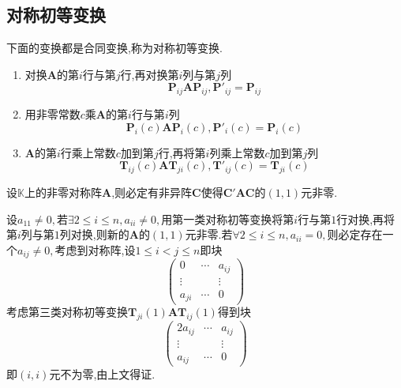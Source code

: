 \subsection{对称初等变换}
\begin{formal}
    \begin{definition}[对称初等变换的定义]\label{def:对称初等变换的定义}
        下面的变换都是合同变换,称为对称初等变换.
        \begin{enumerate}[label={\textup{(\arabic*)}}]
            \item 对换$\bm{A}$的第$i$行与第$j$行,再对换第$i$列与第$j$列\[
            \bm{P}_{ij}\bm{AP}_{ij},\bm{P}'_{ij}=\bm{P}_{ij}            \]
            \item 用非零常数$c$乘$\bm{A}$的第$i$行与第$i$列\[
            \bm{P}_i\left(c\right)\bm{AP}_i\left(c\right),\bm{P}'_i\left(c\right)=\bm{P}_i\left(c\right)            
            \]
            \item $\bm{A}$的第$i$行乘上常数$c$加到第$j$行,再将第$i$列乘上常数$c$加到第$j$列\[
            \bm{T}_{ij}\left(c\right)\bm{AT}_{ji}\left(c\right),\bm{T}'_{ij}\left(c\right)=\bm{T}_{ji}\left(c\right)
            \]
        \end{enumerate}
    \end{definition}
\end{formal}
\begin{green}
    \begin{lemma}[首元非零]\label{lem:首元非零}
        设$\mathbb{K}$上的非零对称阵$\bm{A}$,则必定有非异阵$\bm{C}$使得$\bm{C}'\bm{AC}$的$\left(1,1\right)$元非零.
    \end{lemma}
    \begin{Proof}
        设$a_{11}\neq 0,$若$\exists 2\leqslant i\leqslant n,a_{ii}\neq 0,$用第一类对称初等变换将第$i$行与第$1$行对换,再将第$i$列与第$1$列对换,则新的$\bm{A}$的$\left(1,1\right)$元非零.若$\forall 2\leqslant i\leqslant n,a_{ii}=0,$则必定存在一个$a_{ij}\neq 0,$考虑到对称阵,设$1\leqslant i<j\leqslant n$即块\[
        \begin{pmatrix}
            0&\cdots&a_{ij}\\
            \vdots&&\vdots\\
            a_{ji}&\cdots&0
        \end{pmatrix}
        \]考虑第三类对称初等变换$\bm{T}_{ji}\left(1\right)\bm{AT}_{ij}\left(1\right)$得到块\[
        \begin{pmatrix}
            2a_{ij}&\cdots&a_{ij}\\
            \vdots&&\vdots\\
            a_{ij}&\cdots&0
        \end{pmatrix}
        \]即$\left(i,i\right)$元不为零,由上文得证.
    \end{Proof}
\end{green}

